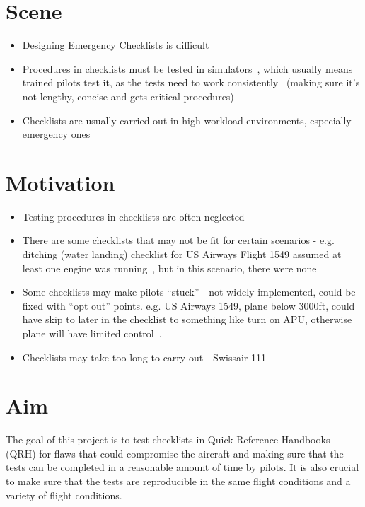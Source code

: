 \documentclass[../dissertation.tex]{subfiles}
\begin{document}
\section{Scene}
\begin{itemize}
    \item Designing Emergency Checklists is difficult
    \item Procedures in checklists must be tested in simulators~\cite{nasa-design},
      which usually means trained pilots test it, as the tests need
      to work consistently~\cite{manifesto} (making sure it's not lengthy,
      concise and gets critical procedures)
    \item Checklists are usually carried out in high
        workload environments, especially emergency ones
\end{itemize}

\section{Motivation}
\begin{itemize}
  \item Testing procedures in checklists are often neglected~\cite{nasa-design}
    \item There are some checklists that may not be fit
        for certain scenarios - e.g. ditching (water landing)
        checklist for US Airways Flight 1549 assumed at least one engine
        was running~\cite{AWE1549}, but in this scenario, there were none
    \item Some checklists may make pilots \enquote{stuck}
      - not widely implemented, could be fixed with \enquote{opt out} points.
      e.g. US Airways 1549, plane below 3000ft, could have skip to
      later in the checklist to something like turn on APU, otherwise plane
      will have limited control~\cite{AWE1549}.
    \item Checklists may take too long to carry out - Swissair 111
\end{itemize}

\section{Aim}
The goal of this project is to test checklists in Quick Reference Handbooks (QRH)
for flaws that could compromise the aircraft and making sure that the tests can
be completed in a reasonable amount of time by pilots. It is also crucial to make
sure that the tests are reproducible in the same flight conditions and a variety of
flight conditions.
\end{document}
